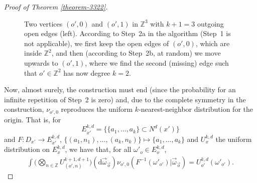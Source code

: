 \documentclass[a4paper, oneside, 11pt]{amsart}
\theoremstyle{definition}
\newcommand{\1}{\mathbbm{1}}
\newcommand{\0}{\mathbf{o}}
\renewcommand{\d}{\mathrm{d}}
\newcommand{\Z}{\mathbb{Z}}
\numberwithin{equation}{section}
\begin{document}
\begin{proof}[Proof of Theorem \ref{theorem-3322}]
\begin{figure}[h!]
\caption{Two vertices $(o',0)$ and $(o',1)$ in $\Z^3$  with $k+1=3$ outgoing open edges (left). According to Step~2a in the algorithm (Step~1 is not applicable), we first keep the open edges of $(o',0)$, which are inside $\Z^2$, and then (according to Step~2b, at random) we move upwards to $(o',1)$, where we find the second (missing) edge such that $o'\in\Z^2$ has now degree $k=2$.}\label{fig_edgemap_2}
\end{figure}
Now, almost surely, the construction must end (since the probability for an infinite repetition of Step~2 is zero) and, due to the complete symmetry in the construction, $\nu_{o',0}$ reproduces the uniform $k$-nearest-neighbor distribution for the origin. That is, for 
$$E^{k,d}_{x'}=\{\{a_1,\dots, a_k\}\subset N^d(x')\}$$ 
and $F\colon D_{x'}\to E^{k,d}_{x'}$, $\big\{(a_1,n_1),\dots,(a_k,n_k)\big\}\mapsto \{a_1,\dots, a_k\}$ and $U^{k,d}_x$ the uniform distribution on $E^{k,d}_x$, we have that, for all $\omega'_o\in E^{k,d}_o$,
\begin{align*}
\int \Big(\bigotimes_{n\in \Z}U^{k+1,d+1}_{(o',n)}\Big)(\d \vec\omega_{\vec o})\nu_{o',0}(F^{-1}(\omega'_{o'})|\vec\omega_{\vec o})=U^{k,d}_{o'}(\omega'_{o'}).
\end{align*}


\end{proof}
\end{document}
